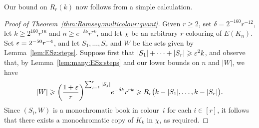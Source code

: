 Our bound on $R_r(k)$ now follows from a simple calculation. 

\begin{proof}[Proof of Theorem~\ref{thm:Ramsey:multicolour:quant}]
Given $r \ge 2$, set $\delta = 2^{-160} r^{-12}$, let $k \ge 2^{160} r^{16}$ and $n \ge e^{-\delta k} r^{rk}$, and let $\chi$ be an arbitrary $r$-colouring of $E(K_n)$. Set $\varepsilon = 2^{-50} r^{-4}$, and let $S_1,\ldots,S_r$ and $W$ be the sets given by Lemma~\ref{lem:ESz:steps}. Suppose first that $|S_1| + \cdots + |S_r| \geqslant \varepsilon^2 k$, and observe that, by Lemma~\ref{lem:many:ESz:steps} and our lower bounds on $n$ and $|W|$, we have 
$$|W| \geqslant \bigg( \frac{1+\varepsilon}{r} \bigg)^{\sum_{j = 1}^r |S_j|} e^{-\delta k} r^{rk} \geqslant R_r\big( k - |S_1|, \ldots, k - |S_r| \big).$$ 
Since $(S_i,W)$ is a monochromatic book in colour~$i$ for each $i \in [r]$, it follows that there exists a monochromatic copy of $K_k$ in $\chi$, as required.


\end{proof}

